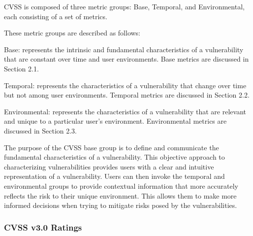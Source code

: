  CVSS is composed of three metric groups: Base, Temporal, and
  Environmental, each consisting of a set of metrics.

  These metric groups are described as follows:

  Base: represents the intrinsic and fundamental characteristics of a
  vulnerability that are constant over time and user environments. Base
  metrics are discussed in Section 2.1.

  Temporal: represents the characteristics of a vulnerability that change
  over time but not among user environments. Temporal metrics are
  discussed in Section 2.2.

  Environmental: represents the characteristics of a vulnerability that
  are relevant and unique to a particular user's environment.
  Environmental metrics are discussed in Section 2.3.

  The purpose of the CVSS base group is to define and communicate the
  fundamental characteristics of a vulnerability. This objective approach
  to characterizing vulnerabilities provides users with a clear and
  intuitive representation of a vulnerability. Users can then invoke the
  temporal and environmental groups to provide contextual information that
  more accurately reflects the risk to their unique environment. This
  allows them to make more informed decisions when trying to mitigate
  risks posed by the vulnerabilities.

  \subsubsection{CVSS v3.0 Ratings}\label{cvss-v3.0-ratings}

